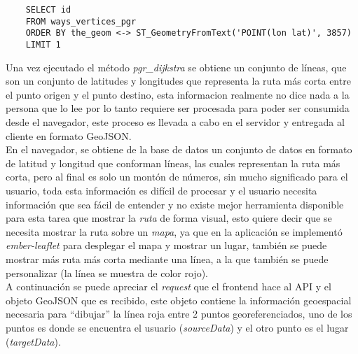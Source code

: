 \begin{verbatim}
    SELECT id
    FROM ways_vertices_pgr
    ORDER BY the_geom <-> ST_GeometryFromText('POINT(lon lat)', 3857)
    LIMIT 1
\end{verbatim}

Una vez ejecutado el método \emph{pgr\_dijkstra} se obtiene un conjunto de líneas, que son un conjunto de latitudes y longitudes que representa la ruta más corta entre el punto origen y el punto destino, esta informacion realmente no dice nada a la persona que lo lee por lo tanto requiere ser procesada para poder ser consumida desde el navegador, este proceso es llevada a cabo en el servidor y entregada al cliente en formato GeoJSON.\\







En el navegador, se obtiene
de la base de datos un conjunto de datos en formato de latitud y longitud que conforman líneas, las cuales representan la ruta más corta, pero al final es solo un montón de números, sin mucho significado para el usuario, toda esta información es difícil de procesar y el usuario necesita información que sea fácil de entender y no existe mejor herramienta disponible para esta tarea que mostrar la \emph{ruta} de forma visual, esto quiere decir que se necesita mostrar la ruta sobre un \emph{mapa}, ya que en la aplicación se implementó \emph{ember-leaflet} para desplegar el mapa y mostrar un lugar, también se puede  mostrar más ruta más corta mediante una línea, a la que también se puede personalizar (la línea se muestra de color rojo).\\

A continuación se puede apreciar el \emph{request} que el frontend hace al API y  el objeto GeoJSON que es recibido, este objeto contiene la información geoespacial necesaria para ``dibujar'' la línea roja entre 2 puntos georeferenciados, uno de los puntos es donde se encuentra el usuario (\emph{sourceData}) y el otro punto es el lugar (\emph{targetData}).


